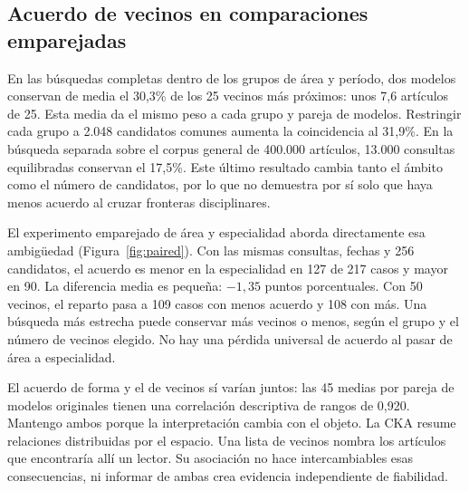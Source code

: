 \documentclass[12pt]{article}
\begin{document}
\subsection{Acuerdo de vecinos en comparaciones emparejadas}
En las búsquedas completas dentro de los grupos de área y período, dos modelos conservan de media el 30,3\% de los 25 vecinos más próximos: unos 7,6 artículos de 25. Esta media da el mismo peso a cada grupo y pareja de modelos. Restringir cada grupo a 2.048 candidatos comunes aumenta la coincidencia al 31,9\%. En la búsqueda separada sobre el corpus general de 400.000 artículos, 13.000 consultas equilibradas conservan el 17,5\%. Este último resultado cambia tanto el ámbito como el número de candidatos, por lo que no demuestra por sí solo que haya menos acuerdo al cruzar fronteras disciplinares.

El experimento emparejado de área y especialidad aborda directamente esa ambigüedad (Figura~\ref{fig:paired}). Con las mismas consultas, fechas y 256 candidatos, el acuerdo es menor en la especialidad en 127 de 217 casos y mayor en 90. La diferencia media es pequeña: $-1{,}35$ puntos porcentuales. Con 50 vecinos, el reparto pasa a 109 casos con menos acuerdo y 108 con más. Una búsqueda más estrecha puede conservar más vecinos o menos, según el grupo y el número de vecinos elegido. No hay una pérdida universal de acuerdo al pasar de área a especialidad.

El acuerdo de forma y el de vecinos sí varían juntos: las 45 medias por pareja de modelos originales tienen una correlación descriptiva de rangos de 0,920. Mantengo ambos porque la interpretación cambia con el objeto. La CKA resume relaciones distribuidas por el espacio. Una lista de vecinos nombra los artículos que encontraría allí un lector. Su asociación no hace intercambiables esas consecuencias, ni informar de ambas crea evidencia independiente de fiabilidad.
\end{document}
